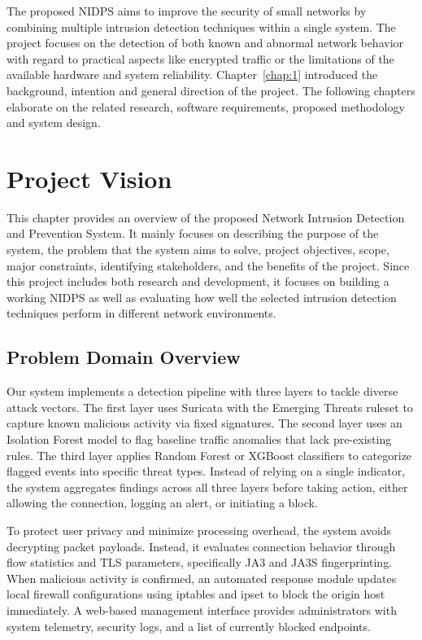 \noindent The proposed NIDPS aims to improve the security of small networks by combining multiple intrusion detection techniques within a single system. The project focuses on the detection of both known and abnormal network behavior with regard to practical aspects like encrypted traffic or the limitations of the available hardware and system reliability. Chapter~\ref{chap:1} introduced the background, intention and general direction of the project. The following chapters elaborate on the related research, software requirements, proposed methodology and system design.

\chapter{Project Vision}\label{chap:2}

\noindent This chapter provides an overview of the proposed Network Intrusion Detection and Prevention System. It mainly focuses on describing the purpose of the system, the problem that the system aims to solve, project objectives, scope, major constraints, identifying stakeholders, and the benefits of the project. Since this project includes both research and development, it focuses on building a working NIDPS as well as evaluating how well the selected intrusion detection techniques perform in different network environments.

\section{Problem Domain Overview}\label{sec:2.1}

\noindent Our system implements a detection pipeline with three layers to tackle diverse attack vectors. The first layer uses Suricata with the Emerging Threats ruleset to capture known malicious activity via fixed signatures. The second layer uses an Isolation Forest model to flag baseline traffic anomalies that lack pre-existing rules. The third layer applies Random Forest or XGBoost classifiers to categorize flagged events into specific threat types. Instead of relying on a single indicator, the system aggregates findings across all three layers before taking action, either allowing the connection, logging an alert, or initiating a block.

\noindent To protect user privacy and minimize processing overhead, the system avoids decrypting packet payloads. Instead, it evaluates connection behavior through flow statistics and TLS parameters, specifically JA3 and JA3S fingerprinting. When malicious activity is confirmed, an automated response module updates local firewall configurations using iptables and ipset to block the origin host immediately. A web-based management interface provides administrators with system telemetry, security logs, and a list of currently blocked endpoints.

